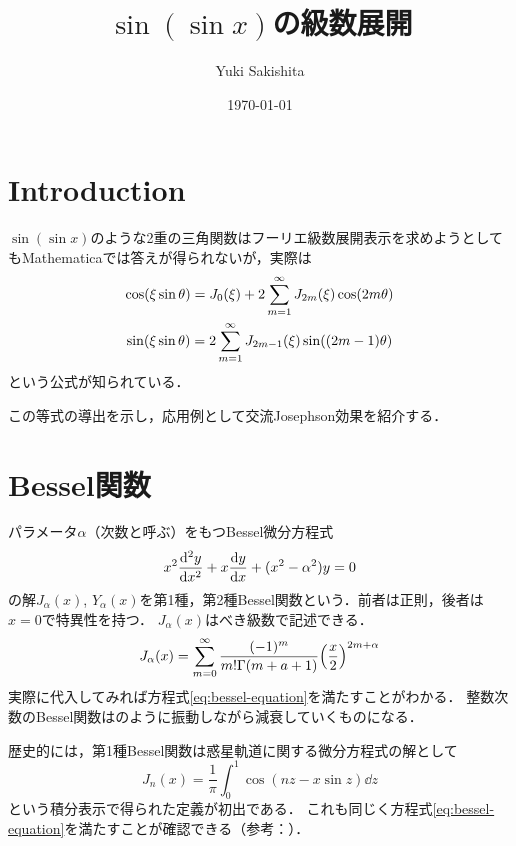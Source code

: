 \documentclass[dvipdfmx,autodetect-engine,12pt,fleqn]{jsarticle}
\title{$\sin(\sin x)$の級数展開}
\author{Yuki Sakishita}
\date{\today}
\begin{document}
\maketitle

\setcounter{section}{-1}
\section{Introduction}
$\sin(\sin x)$のような2重の三角関数はフーリエ級数展開表示を求めようとしてもMathematicaでは答えが得られないが，実際は
\begin{gather*}
    \cos\rbra*{\xi \sin\theta} = J_0(\xi) + 2\sum_{m=1}^\infty J_{2m}(\xi)\cos\rbra{2m\theta}\\
    \sin\rbra*{\xi \sin\theta} = 2\sum_{m=1}^\infty J_{2m-1}(\xi)\sin\rbra{(2m-1)\theta}
\end{gather*}
という公式が知られている．

この等式の導出を示し，応用例として交流Josephson効果を紹介する．

\section{Bessel関数}
パラメータ$\alpha$（次数と呼ぶ）をもつBessel微分方程式
\begin{equation}
\label{eq:bessel-equation}
    x^2\dv[2]{y}{x}+x\dv{y}{x}+(x^2-\alpha^2)y=0
\end{equation}
の解$J_\alpha(x)$, $Y_\alpha(x)$を第1種，第2種Bessel関数という．前者は正則，後者は$x=0$で特異性を持つ．
$J_\alpha(x)$はべき級数で記述できる．
\begin{equation}
\label{eq:bessel-func-as-series}
    J_\alpha(x)=\sum_{m=0}^\infty \frac{(-1)^m}{m!\Gamma(m+a+1)} \qty(\frac{x}{2})^{2m+\alpha}
\end{equation}
実際に代入してみれば方程式\eqref{eq:bessel-equation}を満たすことがわかる．
整数次数のBessel関数はのように振動しながら減衰していくものになる．


歴史的には，第1種Bessel関数は惑星軌道に関する微分方程式の解として
\begin{equation}
    J_n(x)=\frac1\pi\int_0^1 \cos(nz-x\sin z)\dd z
\end{equation}
という積分表示で得られた定義が初出である．
これも同じく方程式\eqref{eq:bessel-equation}を満たすことが確認できる（参考：\cite{bessel}）．
\end{document}
